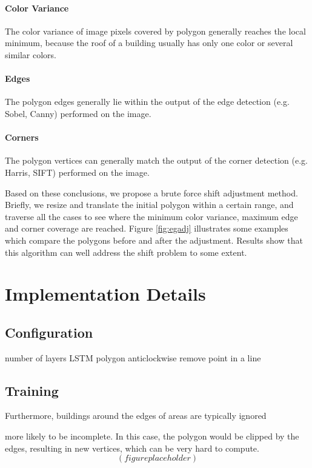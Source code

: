 

\paragraph{Color Variance}
The color variance of image pixels covered by polygon generally reaches the local minimum, because the roof of a building usually has only one color or several similar colors.

\paragraph{Edges}
The polygon edges generally lie within the output of the edge detection (e.g. Sobel, Canny) performed on the image.

\paragraph{Corners}
The polygon vertices can generally match the output of the corner detection (e.g. Harris, SIFT) performed on the image.

Based on these conclusions, we propose a brute force shift adjustment method. Briefly, we resize and translate the initial polygon within a certain range, and traverse all the cases to see where the minimum color variance, maximum edge and corner coverage are reached. Figure \ref{fig:egadj} illustrates some examples which compare the polygons before and after the adjustment. Results show that this algorithm can well address the shift problem to some extent.

\section{Implementation Details}\label{impdet}

\subsection{Configuration}\label{config}

number of layers
LSTM
polygon anticlockwise
remove point in a line

\subsection{Training}

Furthermore, buildings around the edges of areas are typically ignored 

more likely to be incomplete. In this case, the polygon would be clipped by the edges, resulting in new vertices, which can be very hard to compute.
$$(figure placeholder)$$


